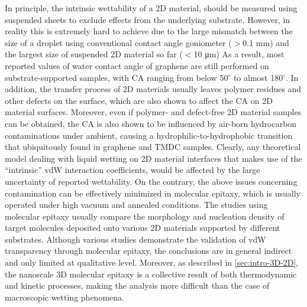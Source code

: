 %
In principle, the intrinsic wettability of a 2D material, should be
measured using suspended sheets to exclude effects from the underlying
substrate.
%
However, in reality this is extremely hard to achieve due to the large
mismatch between the size of a droplet using conventional contact
angle goniometer ($>$0.1 mm) and the largest size of suspended 2D
material so far ($<$10 μm) 
%
As a result, most reported values of water contact angle of graphene
are still performed on substrate-supported samples, with CA ranging
from below 50$^{\circ}$ to almost 180$^{\circ}$.
%
In addition, the transfer process of 2D materials usually leaves
polymer residues and other defects on the surface, which are also
shown to affect the CA on 2D material surfaces. 
%
Moreover, even if polymer- and defect-free 2D material samples can be
obtained, the CA is also shown to be influenced by air-born
hydrocarbon contaminations under ambient, causing a
hydrophilic-to-hydrophobic transition 
that ubiquitously found in graphene and TMDC samples.
%
Clearly, any theoretical model dealing with liquid wetting on 2D
material interfaces that makes use of the ``intrinsic'' vdW
interaction coefficients, would be affected by the
large uncertainty of reported wettability.
%
On the contrary, the above issues concerning contamination can be
effectively minimized in molecular epitaxy, which is usually operated
under high vacuum and annealed conditions.
%
%
The studies using molecular epitaxy usually compare the morphology and
nucleation density of target molecules deposited onto various 2D
materials supported by different substrates.
%
Although various studies demonstrate the validation of vdW
transparency through molecular epitaxy, the conclusions are in general
indirect and only limited at qualitative level.
%
Moreover, as described in \autoref{sec:intro-3D-2D}, the nanoscale 3D
molecular epitaxy is a collective result of both thermodynamic and
kinetic processes, making the analysis more difficult than the case of
macroscopic wetting phenomena.



